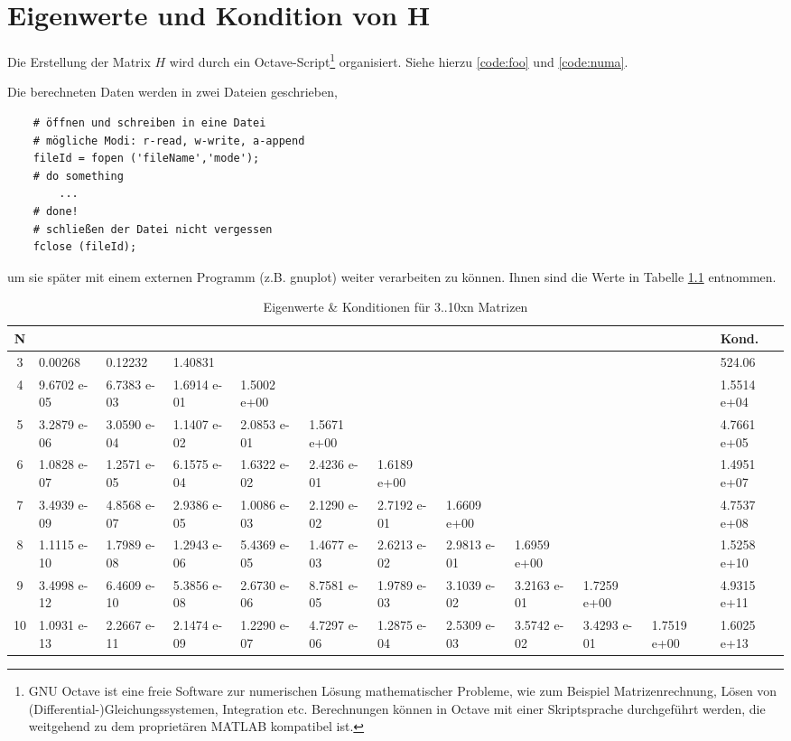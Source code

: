 \chapter{Eigenwerte und Kondition von H}
Die Erstellung der Matrix \(H\) wird durch ein Octave-Script\footnote{GNU Octave ist eine freie
Software zur numerischen Lösung mathematischer Probleme, wie zum Beispiel Matrizenrechnung, Lösen
von (Differential-)Gleichungssystemen, Integration etc. Berechnungen können in Octave mit einer
Skriptsprache durchgeführt werden, die weitgehend zu dem proprietären MATLAB kompatibel ist.}
organisiert. Siehe hierzu \ref{code:foo} und \ref{code:numa}.

Die berechneten Daten werden in zwei Dateien geschrieben,
\begin{lstlisting}
    # öffnen und schreiben in eine Datei
    # mögliche Modi: r-read, w-write, a-append
    fileId = fopen ('fileName','mode');
    # do something
        ...
    # done!
    # schließen der Datei nicht vergessen
    fclose (fileId);
\end{lstlisting}
um sie später mit einem externen Programm (z.B. gnuplot) weiter verarbeiten zu können. Ihnen sind
die Werte in Tabelle \ref{tab:task3} entnommen.

\vspace{1em}
\centering    
\begin{table}[htbp]
\tiny
\caption{Eigenwerte \& Konditionen für 3..10xn Matrizen \label{tab:task3}}         
\begin{tabularx}{\textwidth}{|c|X|X|X|X|X|X|X|X|X|X|X|}
    \hline    
    N &&&&&&&&&&& Kond.\\\hline
    3 & 0.00268 & 0.12232 & 1.40831 &&&&&&&& 524.06\\\hline
    4 & 9.6702 e-05 & 6.7383 e-03 & 1.6914 e-01 & 1.5002 e+00 &&&&&&& 1.5514 e+04\\\hline
    5 & 3.2879 e-06 & 3.0590 e-04 & 1.1407 e-02 & 2.0853 e-01 & 1.5671 e+00 &&&&&& 4.7661 e+05\\\hline
    6 & 1.0828 e-07 & 1.2571 e-05 & 6.1575 e-04 & 1.6322 e-02 & 2.4236 e-01 & 1.6189 e+00 &&&&& 1.4951 e+07\\\hline
    7 & 3.4939 e-09 & 4.8568 e-07 & 2.9386 e-05 & 1.0086 e-03 & 2.1290 e-02 & 2.7192 e-01 & 1.6609 e+00 &&&& 4.7537 e+08\\\hline
    8 & 1.1115 e-10 & 1.7989 e-08 & 1.2943 e-06 & 5.4369 e-05 & 1.4677 e-03 & 2.6213 e-02 & 2.9813 e-01 & 1.6959 e+00 &&& 1.5258 e+10\\\hline
    9 & 3.4998 e-12 & 6.4609 e-10 & 5.3856 e-08 & 2.6730 e-06 & 8.7581 e-05 & 1.9789 e-03 & 3.1039 e-02 & 3.2163 e-01 & 1.7259 e+00 && 4.9315 e+11\\\hline
    10& 1.0931 e-13 & 2.2667 e-11 & 2.1474 e-09 & 1.2290 e-07 & 4.7297 e-06 & 1.2875 e-04 & 2.5309 e-03 & 3.5742 e-02 & 3.4293 e-01 & 1.7519 e+00 & 1.6025 e+13\\\hline
\end{tabularx}
\end{table}